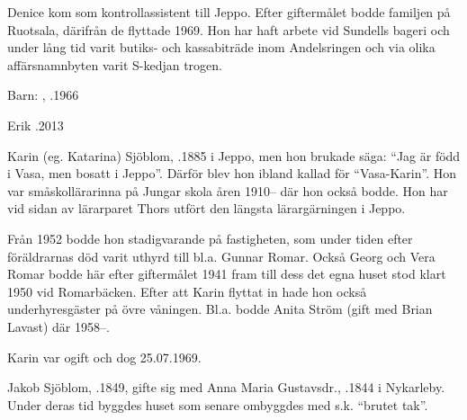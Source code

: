 Denice kom som kontrollassistent till Jeppo. Efter giftermålet bodde familjen på Ruotsala, därifrån de flyttade 1969. Hon har haft arbete vid Sundells bageri och under lång tid varit butiks- och kassabiträde inom Andelsringen och via olika affärsnamnbyten varit S-kedjan trogen.

Barn: , .1966

Erik .2013


Karin (eg. Katarina) Sjöblom, .1885 i Jeppo, men hon brukade säga: ``Jag är född i Vasa, men bosatt i Jeppo''. Därför blev hon ibland kallad för ``Vasa-Karin''. Hon var småskollärarinna på Jungar skola åren 1910-- där hon också bodde. Hon har vid sidan av lärarparet Thors utfört den längsta lärargärningen i Jeppo.

Från 1952 bodde hon stadigvarande på fastigheten, som under tiden efter föräldrarnas död varit uthyrd till bl.a. Gunnar Romar. Också Georg och Vera Romar bodde här efter giftermålet 1941 fram till dess det egna huset stod klart 1950 vid Romarbäcken. Efter att Karin flyttat in hade hon också underhyresgäster på övre våningen. Bl.a. bodde Anita Ström (gift med Brian Lavast) där 1958--.

Karin var ogift och dog 25.07.1969.


Jakob Sjöblom, .1849, gifte sig med Anna Maria Gustavsdr., .1844 i Nykarleby. Under deras tid byggdes huset som senare ombyggdes med s.k. ``brutet tak''.
\begin{jhchildren}
  \item {}
  \item {}
  \item {}
  \item {}
  \item {}
  \item {}
  \item {}
\end{jhchildren}

